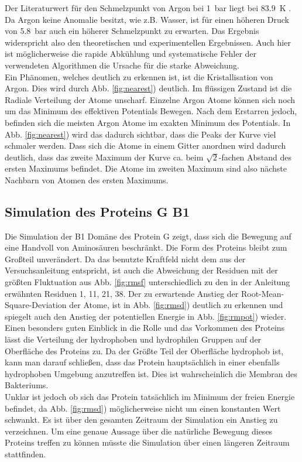 Der Literaturwert für den Schmelzpunkt von Argon bei 1~bar liegt bei 83.9~K \cite{chemicalcrc}. Da Argon keine Anomalie besitzt, wie z.B. Wasser, ist für einen höheren Druck von 5.8~bar auch ein höherer Schmelzpunkt zu erwarten.
Das Ergebnis widerspricht also den theoretischen und experimentellen Ergebnissen.
Auch hier ist möglicherweise die rapide Abkühlung und systematische Fehler der verwendeten Algorithmen die Ursache für die starke Abweichung.
\\ \noindent
Ein Phänomen, welches deutlich zu erkennen ist, ist die Kristallisation von Argon.
Dies wird durch Abb. \ref{fig:nearest}) deutlich.
Im flüssigen Zustand ist die Radiale Verteilung der Atome unscharf.
Einzelne Argon Atome können sich noch um das Minimum des effektiven Potentials Bewegen.
Nach dem Erstarren jedoch, befinden sich die meisten Argon Atome im exakten Minimum des Potentials.
In Abb. \ref{fig:nearest}) wird das dadurch sichtbar, dass die Peaks der Kurve viel schmaler werden.
Dass sich die Atome in einem Gitter anordnen wird dadurch deutlich, dass das zweite Maximum der Kurve ca. beim $\sqrt{2}$-fachen Abstand des ersten Maximums befindet.
Die Atome im zweiten Maximum sind also nächste Nachbarn von Atomen des ersten Maximums.

\subsection{Simulation des Proteins G B1}
Die Simulation der B1 Domäne des Protein G zeigt, dass sich die Bewegung auf eine Handvoll von Aminosäuren beschränkt.
Die Form des Proteins bleibt zum Großteil unverändert.
Da das benutzte Kraftfeld nicht dem aus der Versuchsanleitung entspricht, ist auch die Abweichung der Residuen mit der größten Fluktuation aus Abb. \ref{fig:rmsf} unterschiedlich zu den in der Anleitung erwähnten Residuen 1, 11, 21, 38.
Der zu erwartende Anstieg der Root-Mean-Square-Deviation der Atome, ist in Abb. \ref{fig:rmsd}) deutlich zu erkennen und spiegelt auch den Anstieg der potentiellen Energie in Abb. \ref{fig:rmpot}) wieder.
\\ \noindent
Einen besonders guten Einblick in die Rolle und das Vorkommen des Proteins lässt die Verteilung der hydrophoben und hydrophilen Gruppen auf der Oberfläche des Proteins zu.
Da der Größte Teil der Oberfläche hydrophob ist, kann man darauf schließen, dass das Protein hauptsächlich in einer ebenfalls hydrophoben Umgebung anzutreffen ist.
Dies ist wahrscheinlich die Membran des Bakteriums.
\\ \noindent
Unklar ist jedoch ob sich das Protein tatsächlich im Minimum der freien Energie befindet, da Abb. \ref{fig:rmsd}) möglicherweise nicht um einen konstanten Wert schwankt.
Es ist über den gesamten Zeitraum der Simulation ein Anstieg zu verzeichnen.
Um eine genaue Aussage über die natürliche Bewegung dieses Proteins treffen zu können müsste die Simulation über einen längeren Zeitraum stattfinden.

